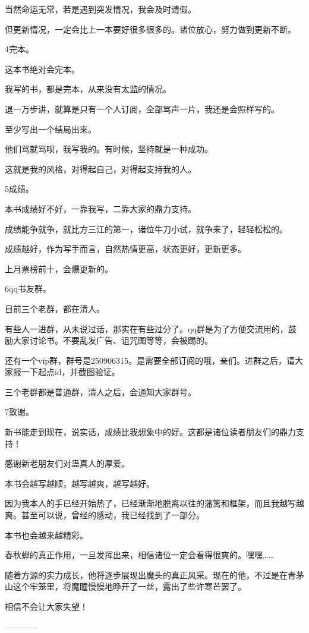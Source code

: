 \begin{this_body}
当然命运无常，若是遇到突发情况，我会及时请假。

但更新情况，一定会比上一本要好很多很多的。诸位放心，努力做到更新不断。

4完本。

这本书绝对会完本。

我写的书，都是完本，从来没有太监的情况。

退一万步讲，就算是只有一个人订阅，全部骂声一片，我还是会照样写的。

至少写出一个结局出来。

他们骂就骂呗，我写我的。有时候，坚持就是一种成功。

这就是我的风格，对得起自己，对得起支持我的人。

5成绩。

本书成绩好不好，一靠我写，二靠大家的鼎力支持。

成绩能争就争，就比方三江的第一，诸位牛刀小试，就争来了，轻轻松松的。

成绩越好，作为写手而言，自然热情更高，状态更好，更新更多。

上月票榜前十，会爆更新的。

6qq书友群。

目前三个老群，都在清人。

有些人一进群，从未说过话，那实在有些过分了。qq群是为了方便交流用的，鼓励大家讨论书。不要乱发广告、诅咒图等等，会被踢的。

还有一个vip群，群号是250906315。是需要全部订阅的哦，亲们。进群之后，请大家报一下起点id，并截图验证。

三个老群都是普通群，清人之后，会通知大家群号。

7致谢。

新书能走到现在，说实话，成绩比我想象中的好。这都是诸位读者朋友们的鼎力支持！

感谢新老朋友们对蛊真人的厚爱。

本书会越写越顺，越写越爽，越写越好。

因为我本人的手已经开始热了，已经渐渐地脱离以往的藩篱和框架，而且我越写越爽。甚至可以说，曾经的感动，我已经找到了一部分。

本书也会越来越精彩。

春秋蝉的真正作用，一旦发挥出来，相信诸位一定会看得很爽的。嘿嘿……

随着方源的实力成长，他将逐步展现出魔头的真正风采。现在的他，不过是在青茅山这个牢笼里，将魔瞳慢慢地睁开了一丝，露出了些许寒芒罢了。

相信不会让大家失望！

------------

\end{this_body}

